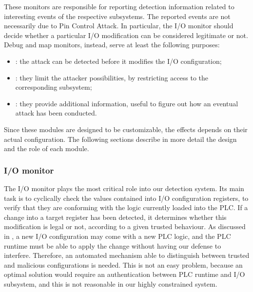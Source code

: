 These monitors are responsible for reporting detection information related to interesting events of the respective subsystems.
The reported events are not necessarily due to Pin Control Attack. In particular, the I/O monitor should decide whether a particular I/O modification
can be considered legitimate or not. Debug and map monitors, instead, serve at least the following purposes:
\begin{itemize}
	\item {}: the attack can be detected before it modifies the I/O configuration;
	\item {}: they limit the attacker possibilities, by restricting access to the corresponding subsystem;
	\item {}: they provide additional information, useful to figure out how an eventual attack has been conducted.
\end{itemize}
Since these modules are designed to be customizable, the effects depends on their actual configuration.
The following sections describe in more detail the design and the role of each module.


\subsubsection{I/O monitor}

The I/O monitor plays the most critical role into our detection system.
Its main task is to cyclically check the values contained into I/O configuration registers, to verify that they are conforming with the logic currently loaded into the PLC.
If a change into a target register has been detected, it determines whether this modification is legal or not, according to a given trusted behaviour.
As discussed in , a new I/O configuration may come with a new PLC logic, and the PLC runtime must be able to apply the change without
having our defense to interfere.
Therefore, an automated mechanism able to distinguish between trusted and malicious configurations is needed.
This is not an easy problem, because an optimal solution would require an authentication between PLC runtime and I/O subsystem,
and this is not reasonable in our highly constrained system.

